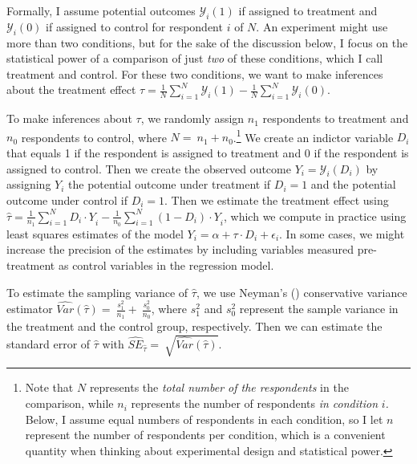 \documentclass[12pt]{article}
\begin{document}
Formally, I assume potential outcomes $\mathcal{Y}_{i}(1)$ if assigned to treatment and $\mathcal{Y}_{i}(0)$ if assigned to control for respondent $i$ of $N$. 
An experiment might use more than two conditions, but for the sake of the discussion below, I focus on the statistical power of a comparison of just \emph{two} of these conditions, which I call treatment and control.
For these two conditions, we want to make inferences about the treatment effect $\tau = \frac{1}{N}\sum_{i = 1}^{N}{\mathcal{Y}_{i}(1)} - \frac{1}{N}\sum_{i = 1}^{N}{\mathcal{Y}_{i}(0)}$.

To make inferences about $\tau$, we randomly assign $n_{1}$ respondents to treatment and $n_{0}$ respondents to control, where $N = \ n_{1} + n_{0}$.\footnote{
  Note that $N$ represents the \emph{total number of the respondents} in the comparison, while $n_{i}$ represents the number of respondents \emph{in condition} $i$\emph{.}
  Below, I assume equal numbers of respondents in each condition, so I let $n$ represent the number of respondents per condition, which is a convenient quantity when thinking about experimental design and statistical power.
  }
We create an indictor variable $D_{i}$ that equals 1 if the respondent is assigned to treatment and 0 if the respondent is assigned to control. 
Then we create the observed outcome $Y_{i} = \mathcal{Y}_{i}\left( D_{i} \right)$ by assigning $Y_{i}$ the potential outcome under treatment if $D_{i} = 1$ and the potential outcome under control if $D_{i} = 1$. 
Then we estimate the treatment effect using $\widehat{\tau} = \frac{1}{n_{1}}\sum_{i = 1}^{N}{{D_{i} \cdot Y}_{i}} - \frac{1}{n_{0}}\sum_{i = 1}^{N}{{\left( 1 - D_{i} \right) \cdot Y}_{i}}$, which we compute in practice using least squares estimates of the model $Y_{i} = \alpha + \tau \cdot D_{i} + \epsilon_{i}$. 
In some cases, we might increase the precision of the estimates by including variables measured pre-treatment as control variables in the regression model.


  
To estimate the sampling variance of $\widehat{\tau}$, we use Neyman's (\citeyear{Neyman1923}) conservative variance estimator $\widehat{Var}\left( \widehat{\tau} \right) = \ \frac{s_{1}^{2}}{n_{1}} + \ \frac{s_{0}^{2}}{n_{0}}$, where $s_{1}^{2}$ and $s_{0}^{2}$ represent the sample variance in the treatment and the control group, respectively. 
Then we can estimate the standard error of $\widehat{\tau}$ with ${\widehat{SE}}_{\widehat{\tau}} = \ \sqrt{\widehat{Var}\left( \widehat{\tau} \right)}$.
\end{document}
